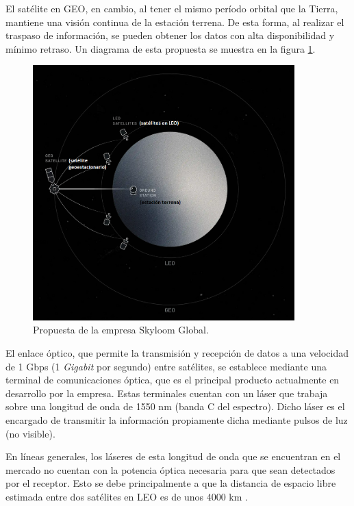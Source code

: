 El satélite en GEO, en cambio, al tener el mismo período orbital que la Tierra, mantiene una visión continua de la estación terrena. De esta forma, al realizar el traspaso de información, se pueden obtener los datos con alta disponibilidad y mínimo retraso. Un diagrama de esta propuesta se muestra en la figura \ref{fig:propSky}.

\begin{figure}[H]
\centering
\includegraphics[width=0.9\textwidth]{./Figures/propuesta_skyloom.png}
\caption{Propuesta de la empresa Skyloom Global\protect\footnotemark.}
\label{fig:propSky}
\end{figure}


El enlace óptico, que permite la transmisión y recepción de datos a una velocidad de 1 Gbps (1 \textit{Gigabit} por segundo) entre satélites, se establece mediante una terminal de comunicaciones óptica, que es el principal producto actualmente en desarrollo por la empresa. Estas terminales cuentan con un láser que trabaja sobre una longitud de onda de 1550 nm (banda C del espectro). Dicho láser es el encargado de transmitir la información propiamente dicha mediante pulsos de luz (no visible).

En líneas generales, los láseres de esta longitud de onda que se encuentran en el mercado no cuentan con la potencia óptica necesaria para que sean detectados por el receptor. Esto se debe principalmente a que la distancia de espacio libre estimada entre dos satélites en LEO es de unos 4000 km \citep{WEBSITE_SKY}.

